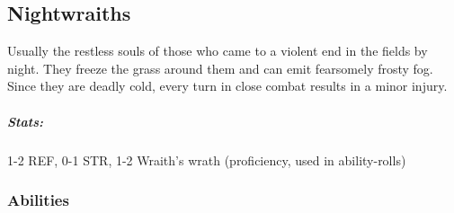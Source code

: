 
\subsection{Nightwraiths}
Usually the restless souls of those who came to a violent end in the fields by night. They freeze the grass around them
and can emit fearsomely frosty fog. Since they are deadly cold, every turn in close combat results in a minor injury.

\subparagraph{Stats:}
1-2 REF, 0-1 STR, 1-2 Wraith's wrath (proficiency, used in ability-rolls)

\subsubsection{Abilities}

